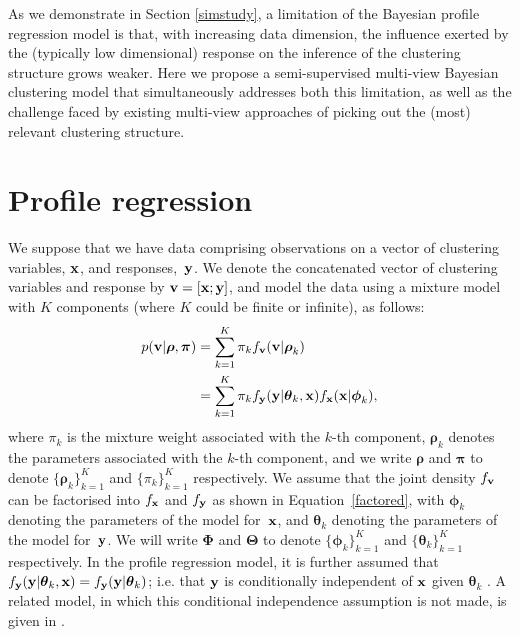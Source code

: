 \documentclass[12pt]{article}
\begin{document}
As we demonstrate in Section \ref{simstudy}, a limitation of the Bayesian profile regression model is that, with increasing data dimension, the influence exerted by the (typically low dimensional) response on the inference of the clustering structure grows weaker.  Here we propose a semi-supervised multi-view Bayesian clustering model that simultaneously addresses both this limitation, as well as the challenge faced by existing multi-view approaches of picking out the (most) relevant clustering structure. 



\section{Profile regression}\label{profile_regression} 
We suppose that we have data comprising observations on a vector of clustering variables, ${\bf x}$, and responses,~${\bf y}$.  We denote the concatenated vector of clustering variables and response by ${\bf v} = [{\bf x}; {\bf y}]$, and  %
 model the data using a mixture model with $K$ components (where $K$ could be finite or infinite), as follows:
\begin{align}
p({\bf v}|\boldsymbol{\rho}, \boldsymbol{\pi}) & = \sum_{k=1}^K \pi_k f_{\bf v}({\bf v}|\boldsymbol{\rho}_k)\\
&= \sum_{k=1}^K \pi_k f_{\bf y}({\bf y}|\boldsymbol{\theta}_k, {\bf x})f_{\bf x}({\bf x}|\boldsymbol{\phi}_k),\label{factored}
\end{align}
where $\pi_k$ is the mixture weight associated with the $k$-th component, $\boldsymbol{\rho}_k$ denotes the parameters associated with the $k$-th component, and we write $\boldsymbol{\rho}$ and $\boldsymbol{\pi}$ to denote $\{\boldsymbol{\rho}_k \}_{k = 1}^K$ and $\{\pi_k \}_{k = 1}^K$ respectively.  We assume that the joint density $f_{\bf v}$ can be factorised into $f_{\bf x}$ and $f_{ {\bf y}}$ as shown in Equation~\eqref{factored}, with $\boldsymbol{\phi}_k$ denoting the parameters of the model for~${\bf x}$, and $\boldsymbol{\theta}_k$ denoting the parameters of the model for~${\bf y}$.  We will write $\boldsymbol{\Phi}$ and $\boldsymbol{\Theta}$ to denote $\{\boldsymbol{\phi}_k \}_{k = 1}^K$ and $\{\boldsymbol{\theta}_k \}_{k = 1}^K$ respectively.  In the profile regression model, it is further assumed that $f_{\bf y}({\bf y}|\boldsymbol{\theta}_k, {\bf x}) = f_{\bf y}({\bf y}|\boldsymbol{\theta}_k)$; i.e. that ${\bf y}$ is conditionally independent of ${\bf x}$ given $\boldsymbol{\theta}_k$ \citep{Molitor2010}.  A related model, in which this conditional independence assumption is not made, is given in \citet{Shahbaba2009}.  
\end{document}
